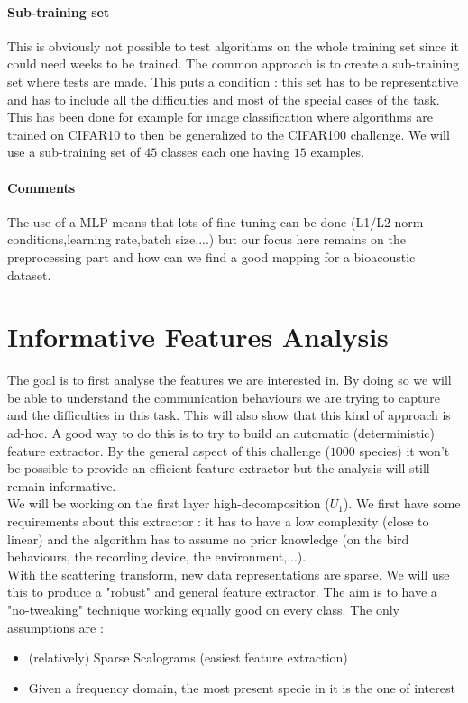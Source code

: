 \documentclass[a4paper]{report}
\begin{document}
\paragraph{Sub-training set}
This is obviously not possible to test algorithms on the whole training set since it could need weeks to be trained. The common approach is to create a sub-training set where tests are made. This puts a condition : this set has to be representative and has to include all the difficulties and most of the special cases of the task. This has been done for example for image classification where algorithms are trained on CIFAR10 to then be generalized to the CIFAR100 challenge.
We will use a sub-training set of $45$ classes each one having $15$ examples. 
\paragraph{Comments}
The use of a MLP means that lots of fine-tuning can be done (L1/L2 norm conditions,learning rate,batch size,...) but our focus here remains on the preprocessing part and how can we find a good mapping for a bioacoustic dataset.

\section{Informative Features Analysis}
The goal is to first analyse the features we are interested in. By doing so we will be able to understand the communication behaviours we are trying to capture and the difficulties in this task. This will also show that this kind of approach is ad-hoc. A good way to do this is to try to build an automatic (deterministic) feature extractor. By the general aspect of this challenge ($1000$ species) it won't be possible to provide an efficient feature extractor but the analysis will still remain informative.
\\
We will be working on the first layer high-decomposition ($U_1$). We first have some requirements about this extractor : it has to have a low complexity (close to linear) and the algorithm has to assume no prior knowledge (on the bird behaviours, the recording device, the environment,...).
\\
With the scattering transform, new data representations are sparse. We will use this to produce a "robust" and general feature extractor. The aim is to have a "no-tweaking" technique working equally good on every class.
 The only assumptions are :
\begin{itemize}

\item (relatively) Sparse Scalograms (easiest feature extraction)
\item Given a frequency domain, the most present specie in it is the one of interest
\end{itemize} 
\end{document}
